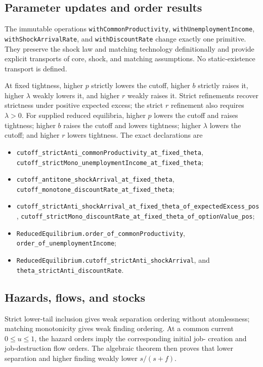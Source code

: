 \documentclass[11pt]{article}
\newcommand{\code}[1]{\texttt{\detokenize{#1}}}
\begin{document}
\subsection{Parameter updates and order results}

The immutable operations \nolinkurl{withCommonProductivity},
\nolinkurl{withUnemploymentIncome}, \nolinkurl{withShockArrivalRate}, and
\nolinkurl{withDiscountRate} change exactly one primitive. They preserve the shock
law and matching technology definitionally and provide explicit transports
of core, shock, and matching assumptions. No static-existence transport is
defined.

At fixed tightness, higher \(p\) strictly lowers the cutoff, higher \(b\)
strictly raises it, higher \(\lambda\) weakly lowers it, and higher \(r\)
weakly raises it. Strict refinements recover strictness under positive
expected excess; the strict \(r\) refinement also requires \(\lambda>0\).
For supplied reduced equilibria, higher \(p\) lowers the
cutoff and raises tightness; higher \(b\) raises the cutoff and lowers
tightness; higher \(\lambda\) lowers the cutoff; and higher \(r\) lowers
tightness. The exact declarations are
{\small\sloppy
\begin{itemize}
\item \nolinkurl{cutoff_strictAnti_commonProductivity_at_fixed_theta},
  \nolinkurl{cutoff_strictMono_unemploymentIncome_at_fixed_theta};
\item \nolinkurl{cutoff_antitone_shockArrival_at_fixed_theta},
  \nolinkurl{cutoff_monotone_discountRate_at_fixed_theta};
\item \nolinkurl{cutoff_strictAnti_shockArrival_at_fixed_theta_of_expectedExcess_pos},
  \nolinkurl{cutoff_strictMono_discountRate_at_fixed_theta_of_optionValue_pos};
\item \nolinkurl{ReducedEquilibrium.order_of_commonProductivity},
  \nolinkurl{order_of_unemploymentIncome};
\item \nolinkurl{ReducedEquilibrium.cutoff_strictAnti_shockArrival}, and
  \nolinkurl{theta_strictAnti_discountRate}.
\end{itemize}}

\subsection{Hazards, flows, and stocks}

Strict lower-tail inclusion gives weak separation ordering without
atomlessness; matching monotonicity gives weak finding ordering. At a common
current \(0\le u\le1\), the hazard orders imply the corresponding initial job-
creation and job-destruction flow orders. The algebraic theorem
\code{steadyUnemployment_monotone} then proves that lower separation and
higher finding weakly lower \(s/(s+f)\).
\end{document}
